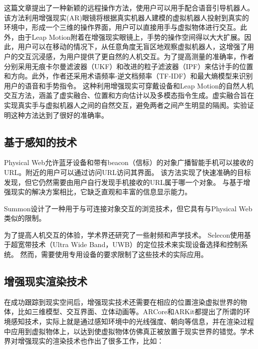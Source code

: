 这篇文章\cite{DuZhaLi19}提出了一种新颖的远程操作方法，使用户可以用手配合语音引导机器人。
该方法利用增强现实(AR)眼镜将根据真实机器人建模的虚拟机器人投射到真实的环境中，形成一个三维的操作界面，用户可以直接用手与虚拟物体进行交互。此外，由于Leap Motion附着在增强现实眼镜上，手势的操作空间得以大大扩展。因此，用户可以在移动的情况下，从任意角度无盲区地观察虚拟机器人，这增强了用户的交互沉浸感，为用户提供了更自然的人机交互。为了提高测量的准确率，作者分别采用无痕卡尔曼滤波器（UKF）和改进的粒子滤波器（IPF）来估计手的位置和方向。此外，作者还采用术语频率-逆文档频率（TF-IDF）和最大熵模型来识别用户的语音和手势指令。
这种利用增强现实可穿戴设备和Leap Motion的自然人机交互方法，涵盖了虚实融合、位置和方向估计以及多模态指令生成。虚实融合旨在实现真实手与虚拟机器人之间的自然交互，避免两者之间产生明显的隔阂。实验证明这种方法达到了很好的准确率。

\subsection{基于感知的技术}
Physical Web\cite{jenson2014physical}允许蓝牙设备和带有beacon（信标）的对象广播智能手机可以接收的URL。附近的用户可以通过访问URL访问其界面。
该方法实现了快速准确的目标发现，但它仍然需要由用户自行发现手机接收的URL属于哪一个对象。
与基于增强现实的解决方案相比，它缺乏直观和丰富的信息显示能力。

Summon\cite{zachariah2020browsing}设计了一种用于与可连接对象交互的浏览技术，但它具有与Physical Web类似的限制。

为了提高人机交互的体验，学术界还研究了一些射频和声学技术\cite{alanwar2017selecon,pu2013whole,mao2016cat}。
Selecon\cite{alanwar2017selecon}使用基于超宽带技术（Ultra Wide Band，UWB）的定位技术来实现设备选择和控制系统。
然而，需要使用专用设备的要求限制了这些技术的实际应用。
\subsection{增强现实渲染技术}
在成功跟踪到现实空间后，增强现实技术还需要在相应的位置渲染虚拟世界的物体，比如三维模型、交互界面、立体动画等。ARCore和ARKit都提出了所谓的环境感知技术，实际上就是通过感知环境中的光线强度、朝向等信息，并在渲染过程中应用到虚拟物体上，以达到使虚拟物体仿佛真正被放置于现实世界的错觉。学术界对增强现实的渲染技术也作出了很多工作，比如：

